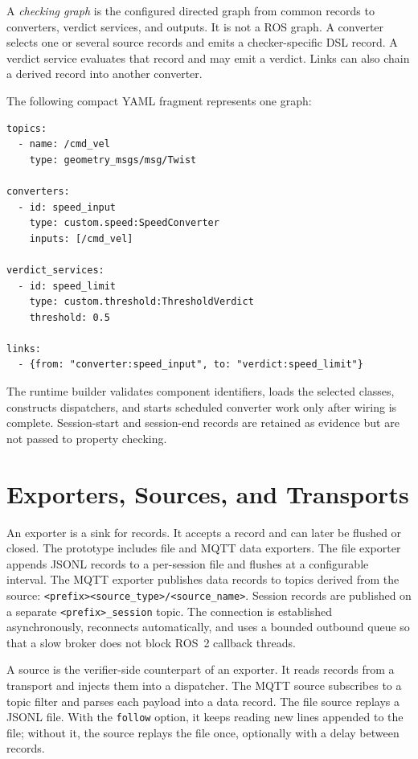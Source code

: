 A \emph{checking graph} is the configured directed graph from common records to
converters, verdict services, and outputs. It is not a ROS graph. A converter
selects one or several source records and emits a checker-specific DSL record.
A verdict service evaluates that record and may emit a verdict. Links can also
chain a derived record into another converter.

The following compact YAML fragment represents one graph:

\begin{lstlisting}[language={},caption={Runtime YAML for a speed property.},
label={lst:speed-yaml}]
topics:
  - name: /cmd_vel
    type: geometry_msgs/msg/Twist

converters:
  - id: speed_input
    type: custom.speed:SpeedConverter
    inputs: [/cmd_vel]

verdict_services:
  - id: speed_limit
    type: custom.threshold:ThresholdVerdict
    threshold: 0.5

links:
  - {from: "converter:speed_input", to: "verdict:speed_limit"}
\end{lstlisting}

The runtime builder validates component identifiers, loads the selected classes,
constructs dispatchers, and starts scheduled converter work only after wiring
is complete. Session-start and session-end records are retained as evidence but
are not passed to property checking.

\section{Exporters, Sources, and Transports}\label{sec:impl-transport}

An exporter is a sink for records. It accepts a record and can later be flushed
or closed. The prototype includes file and MQTT data exporters. The file
exporter appends JSONL records to a per-session file and flushes at a
configurable interval. The MQTT exporter publishes data records to topics
derived from the source:
\texttt{<prefix><source\_type>/<source\_name>}. Session records are published
on a separate \texttt{<prefix>\_session} topic. The connection is established
asynchronously, reconnects automatically, and uses a bounded outbound queue so
that a slow broker does not block ROS~2 callback threads.

A source is the verifier-side counterpart of an exporter. It reads records
from a transport and injects them into a dispatcher. The MQTT source subscribes
to a topic filter and parses each payload into a data record. The file source
replays a JSONL file. With the \texttt{follow} option, it keeps reading new
lines appended to the file; without it, the source replays the file once,
optionally with a delay between records.

